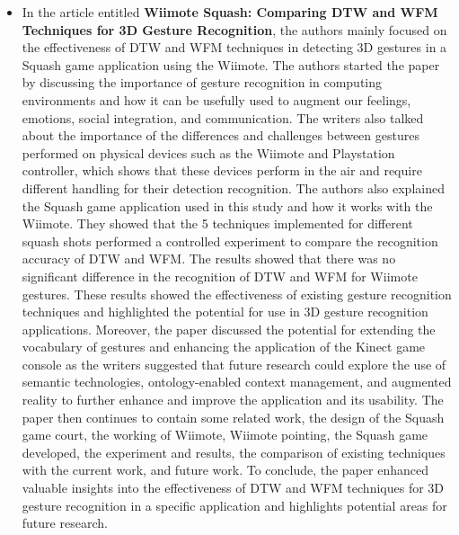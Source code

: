 \documentclass[12pt]{article}
\begin{document}
\begin{itemize}
        \item In the article entitled \textbf {Wiimote Squash: Comparing DTW and WFM  Techniques for 3D Gesture Recognition}\cite{wiimote}, the authors mainly focused on the effectiveness of DTW and WFM techniques in detecting 3D gestures in a Squash game application using the Wiimote. The authors started the paper by discussing the importance of gesture recognition in computing environments and how it can be usefully used to augment our feelings, emotions, social integration, and communication. The writers also talked about the importance of the differences and challenges between gestures performed on physical devices such as the Wiimote and Playstation controller, which shows that these devices perform in the air and require different handling for their detection recognition. The authors also explained the Squash game application used in this study and how it works with the Wiimote. They showed that the 5 techniques implemented for different squash shots performed a controlled experiment to compare the recognition accuracy of DTW and WFM. The results showed that there was no significant difference in the recognition of DTW and WFM for Wiimote gestures. These results showed the effectiveness of existing gesture recognition techniques and highlighted the potential for use in 3D gesture recognition applications. Moreover, the paper discussed the potential for extending the vocabulary of gestures and enhancing the application of the Kinect game console as the writers suggested that future research could explore the use of semantic technologies, ontology-enabled context management, and augmented reality to further enhance and improve the application and its usability. The paper then continues to contain some related work, the design of the Squash game court, the working of Wiimote, Wiimote pointing, the Squash game developed, the experiment and results, the comparison of existing techniques with the current work, and future work. To conclude, the paper enhanced valuable insights into the effectiveness of DTW and WFM techniques for 3D gesture recognition in a specific application and highlights potential areas for future research.


\end{itemize}
\end{document}
